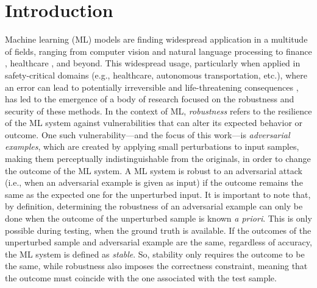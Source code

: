 
\chapter{Introduction}
\label{chp:introduction}

Machine learning (\acs{ML}) models are finding widespread application in a multitude of fields, ranging from computer vision \cite{Mahadevkar22} and natural language processing to finance \cite{Zakaria23}, healthcare \cite{alanazi22}, and beyond. This widespread usage, particularly when applied in safety-critical domains (e.g., healthcare, autonomous transportation, etc.), where an error can lead to potentially irreversible and life-threatening consequences \cite{ai-safety}, has led to the emergence of a body of research focused on the robustness and security of these methods. In the context of \acs{ML}, \emph{robustness} refers to the resilience of  the \acs{ML} system against vulnerabilities that can alter its expected behavior or outcome. One such vulnerability—and the focus of this work—is \emph{adversarial examples}, which are created by applying small perturbations to input samples, making them perceptually indistinguishable from the originals, in order to change the outcome of the \acs{ML} system. A \acs{ML} system is robust to an adversarial attack (i.e., when an adversarial example is given as input) if the outcome remains the same as the expected one for the unperturbed input. It is important to note that, by definition, determining the robustness of an adversarial example can only be done when the outcome of the unperturbed sample is known \emph{a priori}. This is only possible during testing, when the ground truth is available. If the outcomes of the unperturbed sample and adversarial example are the same, regardless of accuracy, the \acs{ML} system is defined as \emph{stable}. So, stability only requires the outcome to be the same, while robustness also imposes the correctness constraint, meaning that the outcome must coincide with the one associated with the test sample.

